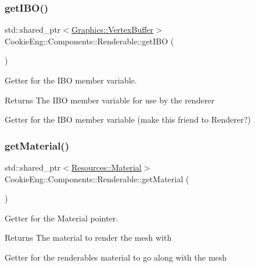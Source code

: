 \subsubsection{\texorpdfstring{get\+I\+B\+O()}{getIBO()}}
{\footnotesize\ttfamily std\+::shared\+\_\+ptr$<$\hyperlink{class_cookie_eng_1_1_graphics_1_1_vertex_buffer}{Graphics\+::\+Vertex\+Buffer}$>$ Cookie\+Eng\+::\+Components\+::\+Renderable\+::get\+I\+BO (\begin{DoxyParamCaption}{ }\end{DoxyParamCaption})\hspace{0.3cm}{\ttfamily [inline]}}



Getter for the I\+BO member variable. 

\begin{DoxyReturn}{Returns}
The I\+BO member variable for use by the renderer
\end{DoxyReturn}
Getter for the I\+BO member variable (make this friend to Renderer?) \mbox{\label{class_cookie_eng_1_1_components_1_1_renderable_a578ffbbc5b4245ade613d0dcfa571413}} 
\subsubsection{\texorpdfstring{get\+Material()}{getMaterial()}}
{\footnotesize\ttfamily std\+::shared\+\_\+ptr$<$\hyperlink{class_cookie_eng_1_1_resources_1_1_material}{Resources\+::\+Material}$>$ Cookie\+Eng\+::\+Components\+::\+Renderable\+::get\+Material (\begin{DoxyParamCaption}{ }\end{DoxyParamCaption})\hspace{0.3cm}{\ttfamily [inline]}}



Getter for the Material pointer. 

\begin{DoxyReturn}{Returns}
The material to render the mesh with
\end{DoxyReturn}
Getter for the renderables material to go along with the mesh \mbox{\label{class_cookie_eng_1_1_components_1_1_renderable_a676d79c49c493b4a67a97aa3c3b5c25e}} 
